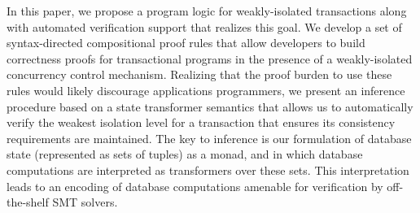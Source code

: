 

In this paper, we propose a program logic for weakly-isolated
transactions along with automated verification support that realizes
this goal.  We develop a set of syntax-directed compositional proof
rules that allow developers to build correctness proofs for
transactional programs in the presence of a weakly-isolated
concurrency control mechanism.  Realizing that the proof burden to use
these rules would likely discourage applications programmers, we
present an inference procedure based on a state transformer semantics
that allows us to automatically verify the weakest isolation level for
a transaction that ensures its consistency requirements are
maintained.  The key to inference is our formulation of database state
(represented as sets of tuples) as a monad, and in which database
computations are interpreted as transformers over these sets.  This
interpretation leads to an encoding of database computations amenable
for verification by off-the-shelf SMT solvers.

